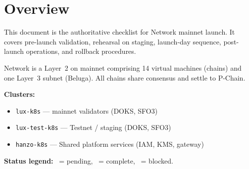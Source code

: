 \section{Overview}


This document is the authoritative checklist for \Zoo{} Network mainnet launch.
It covers pre-launch validation, rehearsal on staging, launch-day sequence,
post-launch operations, and rollback procedures.

\Zoo{} Network is a Layer~2 on \Lux{} mainnet comprising 14 virtual machines
(chains) and one Layer~3 subnet (Beluga). All chains share \Lux{} consensus
and settle to \Lux{} P-Chain.

\medskip
\noindent\textbf{Clusters:}
\begin{itemize}[nosep]
  \item \texttt{lux-k8s} --- \Lux{} mainnet validators (DOKS, SFO3)
  \item \texttt{lux-test-k8s} --- Testnet / staging (DOKS, SFO3)
  \item \texttt{hanzo-k8s} --- Shared platform services (IAM, KMS, gateway)
\end{itemize}

\noindent\textbf{Status legend:}
\pending\ = pending,
\done\ = complete,
\blocked\ = blocked.

